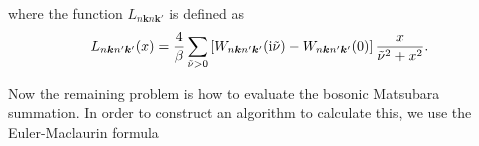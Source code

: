 %
where the function $L_{n\bm k n \bm k'}$ is defined as 
%
\begin{equation}
	L_{n\bm k n' \bm k'}(x) = \frac{4}{\beta}\sum_{\tilde{\nu}>0}
	\left[ 
		W_{n\bm k n' \bm k'}({\rm i}\tilde{\nu}) - W_{n\bm k n' \bm k'}(0)
	\right]
	\frac{x}{\tilde{\nu}^2 + x^2}.
	\label{eq:Lfunc}
\end{equation}
%

Now the remaining problem is how to evaluate the bosonic Matsubara summation.
In order to construct an algorithm to calculate this, we use the Euler-Maclaurin formula





